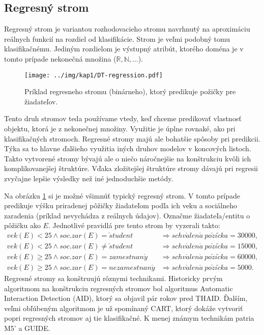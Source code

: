 \subsection{Regresný strom}\label{kap1:2.4:2.4.1:DTRegression}
Regresný strom je variantou rozhodovacieho stromu navrhnutý na aproximáciu reálnych funkcií na rozdiel od klasifikácie. Strom je veľmi podobný tomu klasifikačnému. Jediným rozdielom je výstupný atribút, ktorého doména je v tomto prípade nekonečná množina ($\mathbb{R},\mathbb{N},\ldots$).

\begin{figure}[h]
\centering
\centerline{\mbox{\texttt{[image: ../img/kap1/DT-regression.pdf]}}}
\caption{Príklad regresneho stromu (binárneho), ktorý predikuje požičky pre žiadateľov.}\label{fig:TypesRegression}
\end{figure}

Tento druh stromov teda používame vtedy, keď chceme predikovať vlastnosť objektu, ktorá je z nekonečnej množiny. Využitie je úplne rovnaké, ako pri klasifikačných stromoch. Regresné stromy majú ale bohatšie spôsoby pri predikcii. Týka sa to hlavne ďalšieho využitia iných druhov modelov v koncových listoch. Takto vytvorené stromy bývajú ale o niečo náročnejšie na konštrukciu kvôli ich komplikovanejšej štruktúre. Vďaka zložitejšej štruktúre stromy dávajú pri regresii zvyčajne lepšie výsledky než iné jednoduchšie metódy.

Na obrázku \ref{fig:TypesRegression} si je možné všimnúť typický regresný strom. V tomto prípade predikuje výšku priradenej pôžičky žiadateľom podľa ich veku a sociálneho zaradenia (príklad nevychádza z reálnych údajov). Označme žiadateľa/entitu o pôžičku ako $E$. Jednotlivé pravidlá pre tento strom by vyzerali takto:
\begin{align}
vek(E) < 25 \wedge soc.zar(E) = \check{s}tudent &\Rightarrow schv\acute{a}len\acute{a}\  po\check{z}i\check{c}ka = 30000, \nonumber \\
vek(E) < 25 \wedge soc.zar(E) \neq \check{s}tudent &\Rightarrow schv\acute{a}len\acute{a}\  po\check{z}i\check{c}ka = 15000, \nonumber \\
vek(E) \geq 25 \wedge soc.zar(E) = zamestnan\acute{y} &\Rightarrow schv\acute{a}len\acute{a}\  po\check{z}i\check{c}ka = 60000, \nonumber \\
vek(E) \geq 25 \wedge soc.zar(E) = nezamestnan\acute{y} &\Rightarrow schv\acute{a}len\acute{a}\ po\check{z}i\check{c}ka = 5000. \nonumber 
\end{align}
Regresné stromy sa konštruujú rôznymi technikami. Historicky prvým algoritmom na konštrukciu regresných stromov bol algoritmus Automatic Interaction Detection (AID), ktorý sa objavil pár rokov pred THAID. Ďalším, veľmi obľúbeným algoritmom je už spomínaný CART, ktorý dokáže vytvoriť popri regresných stromov aj tie klasifikačné. K menej známym technikám patria M5' a GUIDE.

